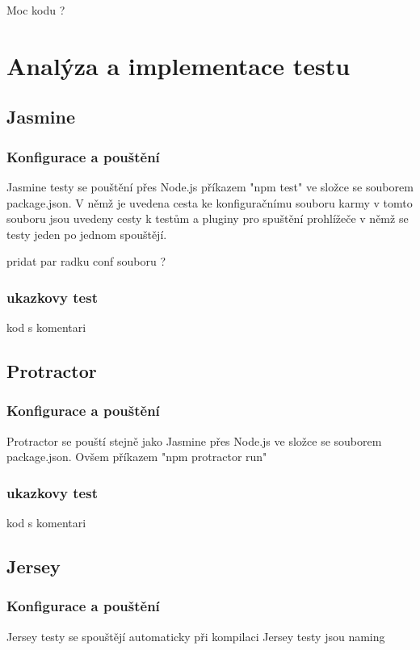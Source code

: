 \documentclass[czech,master,public,dept460,male,cpdeclaration,twoside]{diploma}
\begin{document}
Moc kodu ?

\section{Analýza a implementace testu}

\subsection{Jasmine}
\subsubsection{Konfigurace a pouštění}
Jasmine testy se pouštění přes Node.js příkazem "npm test" ve složce se souborem package.json. V němž je uvedena cesta ke konfiguračnímu souboru karmy v tomto souboru jsou uvedeny cesty k testům a pluginy pro spuštění prohlížeče v němž se testy jeden po jednom spouštějí. 

pridat par radku conf souboru ?

\subsubsection{ukazkovy test}
kod s komentari



\subsection{Protractor}
\subsubsection{Konfigurace a pouštění}
Protractor se pouští stejně jako Jasmine přes Node.js ve složce se souborem package.json. Ovšem příkazem "npm protractor run"

\subsubsection{ukazkovy test}
kod s komentari


\subsection{Jersey}
\subsubsection{Konfigurace a pouštění}
Jersey testy se spouštějí automaticky při kompilaci 
Jersey testy jsou 
naming 
\end{document}
